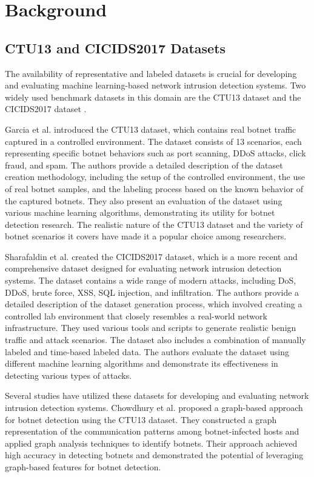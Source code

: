 \chapter{Background}

\section{CTU13 and CICIDS2017 Datasets}

The availability of representative and labeled datasets is crucial for developing and evaluating machine learning-based network intrusion detection systems. Two widely used benchmark datasets in this domain are the CTU13 dataset \cite{garcia2014empirical} and the CICIDS2017 dataset \cite{sharafaldin2018toward}.

Garcia et al. \cite{garcia2014empirical} introduced the CTU13 dataset, which contains real botnet traffic captured in a controlled environment. The dataset consists of 13 scenarios, each representing specific botnet behaviors such as port scanning, DDoS attacks, click fraud, and spam. The authors provide a detailed description of the dataset creation methodology, including the setup of the controlled environment, the use of real botnet samples, and the labeling process based on the known behavior of the captured botnets. They also present an evaluation of the dataset using various machine learning algorithms, demonstrating its utility for botnet detection research. The realistic nature of the CTU13 dataset and the variety of botnet scenarios it covers have made it a popular choice among researchers.

Sharafaldin et al. \cite{sharafaldin2018toward} created the CICIDS2017 dataset, which is a more recent and comprehensive dataset designed for evaluating network intrusion detection systems. The dataset contains a wide range of modern attacks, including DoS, DDoS, brute force, XSS, SQL injection, and infiltration. The authors provide a detailed description of the dataset generation process, which involved creating a controlled lab environment that closely resembles a real-world network infrastructure. They used various tools and scripts to generate realistic benign traffic and attack scenarios. The dataset also includes a combination of manually labeled and time-based labeled data. The authors evaluate the dataset using different machine learning algorithms and demonstrate its effectiveness in detecting various types of attacks.

Several studies have utilized these datasets for developing and evaluating network intrusion detection systems. Chowdhury et al. \cite{chowdhury2017botnet} proposed a graph-based approach for botnet detection using the CTU13 dataset. They constructed a graph representation of the communication patterns among botnet-infected hosts and applied graph analysis techniques to identify botnets. Their approach achieved high accuracy in detecting botnets and demonstrated the potential of leveraging graph-based features for botnet detection.

